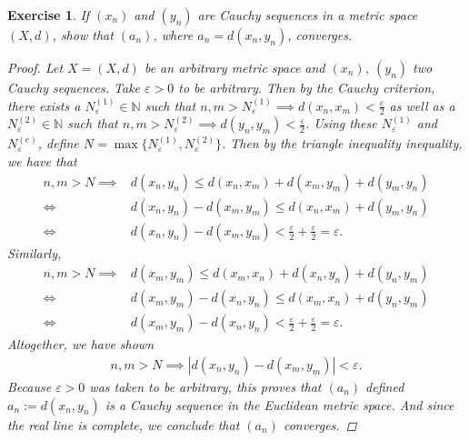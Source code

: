 \documentclass[11pt]{article}
\theoremstyle{mystyle}
\newtheorem{protoexer}{Exercise}[section]
\newenvironment{exer}
{\colorlet{shadecolor}{blue!15}\begin{shaded}\begin{protoexer}}
{\end{protoexer}\end{shaded}}
\begin{document}
\begin{exer}\label{twocauchyconverge}
If $(x_n)$ and $(y_n)$ are Cauchy sequences in a metric space $(X, d)$, show that $(a_n)$, where $a_n = d(x_n, y_n)$, converges.
\begin{proof}
Let $X =(X, d)$ be an arbitrary metric space and $(x_n)$, $(y_n)$ two Cauchy sequences. Take $\varepsilon > 0$ to be arbitrary. Then by the Cauchy criterion, there exists a $N_{\varepsilon}^{(1)} \in \mathbb{N}$ such that $n, m > N_{\varepsilon}^{(1)} \implies d(x_n, x_m) < \frac{\varepsilon}{2}$ as well as a $N_{\varepsilon}^{(2)} \in \mathbb{N}$ such that $n, m > N_{\varepsilon}^{(2)} \implies d(y_n, y_m) < \frac{\varepsilon}{2}$. Using these $N_{\varepsilon}^{(1)}$ and $N_{\varepsilon}^{(e)}$, define $N = \max\{N_{\varepsilon}^{(1)}, N_{\varepsilon}^{(2)}\}$. Then by the triangle inequality inequality, we have that
\begin{align*}
    n, m > N \implies &d(x_n , y_n) \leq d(x_n, x_m) + d(x_m, y_m) + d(y_m, y_n)\\
    \iff& d(x_n, y_n) - d(x_m, y_m) \leq d(x_n, x_m) + d(y_m, y_n)\\
    \iff& d(x_n, y_n) - d(x_m, y_m) < \frac{\varepsilon}{2} +\frac{\varepsilon}{2} = \varepsilon.
\end{align*}
Similarly, 
\begin{align*}
     n, m > N \implies &d(x_m , y_m) \leq d(x_m, x_n) + d(x_n, y_n) + d(y_n, y_m)\\
     \iff&d(x_m , y_m) -  d(x_n, y_n)\leq d(x_m, x_n) + d(y_n, y_m)\\
     \iff& d(x_m , y_m) -  d(x_n, y_n) < \frac{\varepsilon}{2} +\frac{\varepsilon}{2} = \varepsilon.
\end{align*}
Altogether, we have shown
\begin{align*}
    n, m > N \implies |d(x_n, y_n) - d(x_m, y_m)| < \varepsilon.
\end{align*}
Because $\varepsilon > 0$ was taken to be arbitrary, this proves that $(a_n)$ defined $a_n := d(x_n, y_n)$ is a Cauchy sequence in the Euclidean metric space. And since the real line is complete, we conclude that $(a_n)$ converges.
\end{proof}
\end{exer}
    
\end{document}
